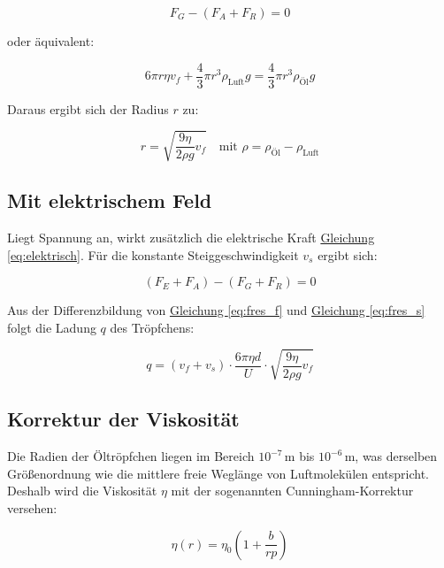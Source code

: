 \begin{equation}
    F_G - (F_A + F_R) = 0 \label{eq:fres_f}
\end{equation}

oder äquivalent:

\begin{equation}
    6 \pi r \eta v_f + \frac{4}{3}\pi r^3 \rho_\text{Luft} g = \frac{4}{3}\pi r^3 \rho_\text{Öl} g
\end{equation}

Daraus ergibt sich der Radius $r$ zu:

\begin{equation}
    r = \sqrt{\frac{9 \eta}{2 \rho g} v_f} \quad \text{mit } \rho = \rho_\text{Öl} - \rho_\text{Luft} \label{eq:radius}
\end{equation}

\subsection*{Mit elektrischem Feld}
Liegt Spannung an, wirkt zusätzlich die elektrische Kraft \hyperref[eq:elektrisch]{Gleichung \ref*{eq:elektrisch}}. Für die konstante Steiggeschwindigkeit $v_s$ ergibt sich:

\begin{equation}
    (F_E + F_A) - (F_G + F_R) = 0 \label{eq:fres_s}
\end{equation}

Aus der Differenzbildung von \hyperref[eq:fres_f]{Gleichung \ref*{eq:fres_f}} und \hyperref[eq:fres_s]{Gleichung \ref*{eq:fres_s}} folgt die Ladung $q$ des Tröpfchens:

\begin{equation}
    q = (v_f + v_s) \cdot \frac{6 \pi \eta d}{U} \cdot \sqrt{\frac{9 \eta}{2 \rho g} v_f} \label{eq:ladung}
\end{equation}

\subsection*{Korrektur der Viskosität}
Die Radien der Öltröpfchen liegen im Bereich $10^{-7}\,\text{m}$ bis $10^{-6}\,\text{m}$, was derselben Größenordnung wie die mittlere freie Weglänge von Luftmolekülen entspricht. Deshalb wird die Viskosität $\eta$ mit der sogenannten Cunningham-Korrektur versehen:

\begin{equation}
    \eta(r) = \eta_0 \left(1 + \frac{b}{rp}\right) \label{eq:cunningham}
\end{equation}

